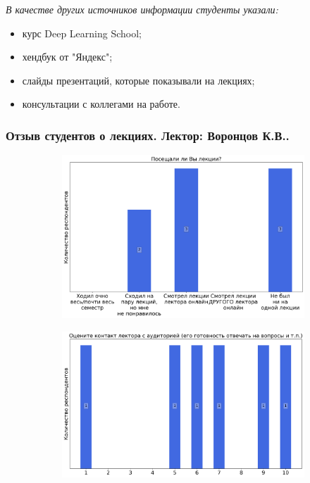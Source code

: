 		\textit{В качестве других источников информации студенты указали:} 
		\begin{itemize}
			\item курс Deep Learning School;
			\item хендбук от "Яндекс";
			\item слайды презентаций, которые показывали на лекциях;
			\item консультации с коллегами на работе.
		\end{itemize}

	\subsubsection{Отзыв студентов о лекциях. Лектор: Воронцов К.В..}
		\begin{figure}[H]
			\centering
            \begin{subfigure}[b]{0.45\textwidth}
				\centering
				\includegraphics[width=\textwidth]{images/4 course/Введение в машинное обучение/lecturer-questions-Воронцов К.В.-0.png}
			\end{subfigure}
			\begin{subfigure}[b]{0.45\textwidth}
				\centering
				\includegraphics[width=\textwidth]{images/4 course/Введение в машинное обучение/lecturer-marks-Воронцов К.В.-0.png}

\end{subfigure}
\end{figure}
